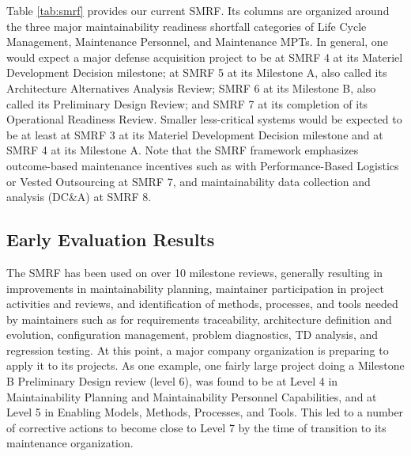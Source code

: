 Table \ref{tab:smrf} provides our current SMRF. Its columns are organized around the three major maintainability readiness shortfall categories of Life Cycle Management, Maintenance Personnel, and Maintenance MPTs. In general, one would expect a major defense acquisition project to be at SMRF 4 at its Materiel Development Decision milestone; at SMRF 5 at its Milestone A, also called its Architecture Alternatives Analysis Review; SMRF 6 at its Milestone B, also called its Preliminary Design Review; and SMRF 7 at its completion of its Operational Readiness Review. Smaller less-critical systems would be expected to be at least at SMRF 3 at its Materiel Development Decision milestone and at SMRF 4 at its Milestone A. Note that the SMRF framework emphasizes outcome-based maintenance incentives such as with Performance-Based Logistics or Vested Outsourcing \citep{vitasek2013vested} at SMRF 7, and maintainability data collection and analysis (DC\&A) at SMRF 8.



\subsection{Early Evaluation Results}
The SMRF has been used on over 10 milestone reviews, generally resulting in improvements in maintainability planning, maintainer participation in project activities and reviews, and identification  of methods, processes, and tools needed by maintainers such as  for requirements traceability, architecture definition and evolution, configuration management, problem diagnostics, TD analysis, and regression testing. At this point, a major company organization is preparing to apply it to its projects.
As one example, one fairly large project doing a Milestone B Preliminary Design review (level 6), was found to be at Level 4 in Maintainability Planning and Maintainability Personnel Capabilities, and at Level 5 in Enabling Models, Methods, Processes, and Tools. This led to a number of corrective actions to become close to Level 7 by the time of transition to its maintenance organization.

